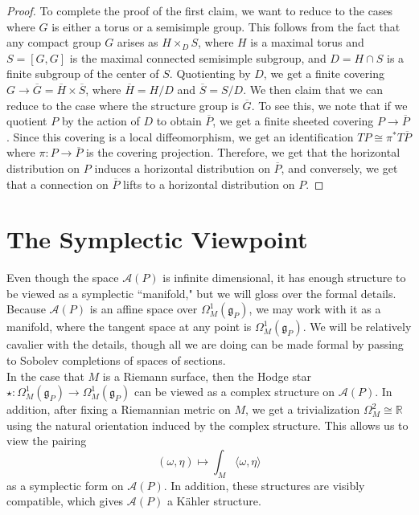 \documentclass[psamsfonts, 12pt]{amsart}
\theoremstyle{definition}
\theoremstyle{remark}
\newcommand{\R}{\mathbb{R}}
\newcommand{\g}{\mathfrak{g}}
\begin{document}
\begin{proof}
To complete the proof of the first claim, we want to reduce to the cases where
$G$ is either a torus or a semisimple group. This follows from the fact
that any compact group $G$ arises as $H \times_D S$, where $H$ is a maximal torus
and $S = [G,G]$ is the maximal connected semisimple subgroup, and $D = H \cap S$ is
a finite subgroup of the center of $S$. Quotienting by $D$, we get a finite covering
$G \to \overline{G} = \overline{H} \times \overline{S}$, where
$\overline{H} = H/D$ and $\overline{S} = S/D$. We then claim that we can reduce to
the case where the structure group is $\overline{G}$. To see this, we note that
if we quotient $P$ by the action of $D$ to obtain $\overline{P}$, we get a finite
sheeted covering $P \to \overline{P}$. Since this covering is a local diffeomorphism,
we get an identification $TP \cong \pi^*T\overline{P}$ where $\pi : P \to \overline{P}$
is the covering projection. Therefore, we get that the horizontal distribution on
$P$ induces a horizontal distribution on $\overline{P}$, and conversely, we get
that a connection on $\overline{P}$ lifts to a horizontal distribution on $P$.
\end{proof}
%
\section{The Symplectic Viewpoint}
%
Even though the space $\mathscr{A}(P)$ is infinite dimensional, it has enough structure
to be viewed as a symplectic ``manifold," but we will gloss over the formal details.
Because $\mathcal{A}(P)$ is an affine space over $\Omega_M^1(\g_P)$, we may
work with it as a manifold, where the tangent space at any point is $\Omega_M^1(\g_P)$.
We will be relatively cavalier with the details, though all we are doing can be made
formal by passing to Sobolev completions of spaces of sections. \\

In the case that $M$ is a Riemann surface, then the Hodge star
$\star : \Omega^1_M(\g_P) \to \Omega^1_M(\g_P)$ can be viewed as a complex
structure on $\mathscr{A}(P)$. In addition, after fixing a Riemannian metric on $M$,
we get a trivialization $\Omega_M^2 \cong \R$ using the natural orientation induced
by the complex structure. This allows us to view the pairing
\[
(\omega,\eta) \mapsto \int_M \langle\omega,\eta\rangle
\]
as a symplectic form on $\mathscr{A}(P)$. In addition, these structures are
visibly compatible, which gives $\mathscr{A}(P)$ a K\"ahler structure. \\
\end{document}
